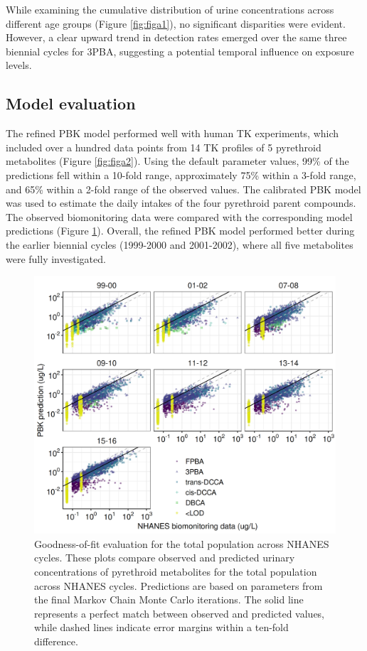 \documentclass[toxics,article,submit,pdftex,moreauthors]{Definitions/mdpi}
\begin{document}
While examining the cumulative distribution of urine concentrations
across different age groups (Figure \ref{fig:figa1}), no significant
disparities were evident. However, a clear upward trend in detection
rates emerged over the same three biennial cycles for 3PBA, suggesting a
potential temporal influence on exposure levels.

\subsection{Model evaluation}\label{model-evaluation}

The refined PBK model performed well with human TK experiments, which
included over a hundred data points from 14 TK profiles of 5 pyrethroid
metabolites (Figure \ref{fig:figa2}). Using the default parameter values, 99\% of the predictions
fell within a 10-fold range, approximately 75\% within a 3-fold range,
and 65\% within a 2-fold range of the observed values. The calibrated
PBK model was used to estimate the daily intakes of the four pyrethroid
parent compounds. The observed biomonitoring data were compared with the
corresponding model predictions (Figure \ref{fig:fig3}). Overall, the
refined PBK model performed better during the earlier biennial cycles
(1999-2000 and 2001-2002), where all five metabolites were fully
investigated.

\begin{figure}[H]
\centering
\begin{adjustwidth}{-2cm}{}
\centering
\includegraphics[width=\linewidth]{figures/fig3}
\hfill
\end{adjustwidth}
\caption{Goodness-of-fit evaluation for the total population across NHANES
cycles. These plots compare observed and predicted urinary concentrations of
pyrethroid metabolites for the total population across NHANES cycles.
Predictions are based on parameters from the final Markov Chain Monte Carlo
iterations. The solid line represents a perfect match between observed and
predicted values, while dashed lines indicate error margins within a ten-fold
difference.\label{fig:fig3}}
\end{figure}
\end{document}
